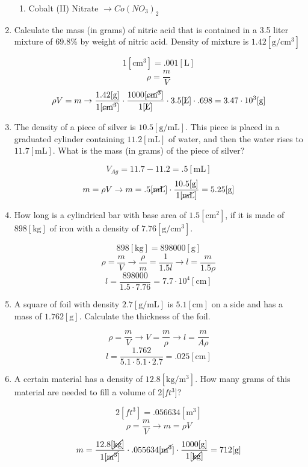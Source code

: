 \documentclass[12pt]{article}
\begin{document}
\begin{enumerate}
\begin{enumerate}
      \item Cobalt (II) Nitrate $\rightarrow Co(NO_3)_2$

    \end{enumerate}

  \item Calculate the mass (in grams) of nitric acid that is contained in a 3.5 liter mixture of 69.8\% by weight of nitric acid. Density of mixture is $1.42[\si{\gram\per\centi\meter\cubed}]$

    $$1[\si{\centi\meter\cubed}]=.001[\si{\liter}]$$
    $$\rho=\frac{m}{V}$$
    $$\rho V=m \rightarrow \frac{1.42[\si{\gram}]}{1[\cancel{\si{\centi\meter\cubed}}]}\cdot\frac{1000[\cancel{\si{\centi\meter\cubed}}]}{1[\cancel{\si{\liter}}]}\cdot 3.5[\cancel{\si{\liter}}]\cdot.698=3.47\cdot10^3[\si{\gram}]$$

  \item The density of a piece of silver is $10.5[\si{\gram\per\milli\liter}]$. This piece is placed in a graduated cylinder containing $11.2[\si{\milli\liter}]$ of water, and then the water rises to $11.7[\si{\milli\liter}]$. What is the mass (in grams) of the piece of silver?

    $$V_{Ag}=11.7-11.2=.5[\si{\milli\liter}]$$
    $$m=\rho V\rightarrow m=.5[\cancel{\si{\milli\liter}}]\cdot\frac{10.5[\si{\gram}]}{1[\cancel{\si{\milli\liter}}]}=5.25[\si{\gram}]$$

  \item How long is a cylindrical bar with base area of $1.5[\si{\centi\meter\squared}]$, if it is made of $898[\si{\kilo\gram}]$ of iron with a density of $7.76[\si{\gram\per\centi\meter\cubed}]$.

    $$898[\si{\kilo\gram}]=898000[\si{\gram}]$$
    $$\rho=\frac{m}{V}\rightarrow\frac{\rho}{m}=\frac{1}{1.5l}\rightarrow l=\frac{m}{1.5\rho}$$
    $$l=\frac{898000}{1.5\cdot7.76}=7.7\cdot10^4[\si{\centi\meter}]$$

  \item A square of foil with density $2.7[\si{\gram\per\milli\liter}]$ is $5.1[\si{\centi\meter}]$ on a side and has a mass of $1.762[\si{\gram}]$. Calculate the thickness of the foil.

    $$\rho=\frac{m}{V}\rightarrow V=\frac{m}{\rho}\rightarrow l=\frac{m}{A\rho}$$
    $$l=\frac{1.762}{5.1\cdot5.1\cdot2.7}=.025[\si{\centi\meter}]$$

  \item A certain material has a density of $12.8[\si{\kilo\gram\per\meter\cubed}]$. How many grams of this material are needed to fill a volume of 2[$ft^3$]?

    $$2[ft^3]=.056634[\si{\meter\cubed}]$$
    $$\rho=\frac{m}{V}\rightarrow m=\rho V$$
    $$m=\frac{12.8[\cancel{\si{\kilo\gram}}]}{1[\cancel{\si{\meter\cubed}}]}\cdot.055634[\cancel{\si{\meter\cubed}}]\cdot\frac{1000[\si{\gram}]}{1[\cancel{\si{\kilo\gram}}]}=712[\si{\gram}]$$

\end{enumerate}
\end{document}
